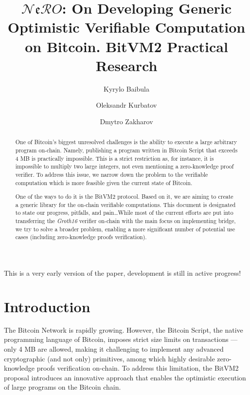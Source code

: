 \documentclass{iacrtrans}
\author{Kyrylo Baibula \inst{1} \and Oleksandr Kurbatov\inst{1} \and
Dmytro Zakharov\inst{1}}
\institute{Distributed Lab
  \email{dmytro.zakharov@distributedlab.com},
\email{ok@distributedlab.com}, \email{kyrylo.baybula@distributedlab.com}}
\title[Verifiable Computation on Bitcoin]{$\mathcal{N}\mathfrak{e}\mathcal{R}O$: On Developing Generic Optimistic Verifiable Computation on Bitcoin. BitVM2 Practical Research}
\begin{document}
\maketitle


\begin{abstract}
  One of Bitcoin's biggest unresolved challenges is the ability to execute 
  a large arbitrary program on-chain. Namely, publishing a program written in 
  Bitcoin Script that exceeds 4 MB is practically impossible. 
  This is a strict restriction as, for instance, it 
  is impossible to multiply two large integers, 
  not even mentioning a zero-knowledge proof verifier. To
  address this issue, we narrow down the problem to the verifiable computation
  which is more feasible given the current state of Bitcoin.

  One of the ways to do it is the BitVM2 protocol. Based on it, we are aiming to create a generic library for the on-chain verifiable computations. This document is designated to state our progress, pitfalls, and pain\ldots While most of the current efforts are put into transferring the \textit{Groth16} verifier on-chain with the main focus on implementing bridge, we try to solve a broader problem, enabling a more significant number of potential use cases (including zero-knowledge proofs verification).
\end{abstract}

\setcounter{tocdepth}{2}
\tableofcontents

\begin{tcolorbox}[colback=green!15!white, halign title=flush center, colframe=green!70!black, fonttitle=\bfseries\large, title=Note, sharp corners]
  \centering This is a very early version of the paper, development is still in active progress!
\end{tcolorbox}

\section{Introduction}\label{sec:intro}

The Bitcoin Network \autocite{bitcoin_paper} is rapidly growing. However, the Bitcoin Script, the native programming language of Bitcoin, imposes strict size limits on transactions --- only 4 MB are allowed, making it challenging to implement any advanced cryptographic (and not only) primitives, among which highly desirable zero-knowledge proofs verification on-chain. To address this limitation, the BitVM2 \autocite{bitvm2} proposal introduces an innovative approach that enables the optimistic execution of large programs on the Bitcoin chain. 
\end{document}
